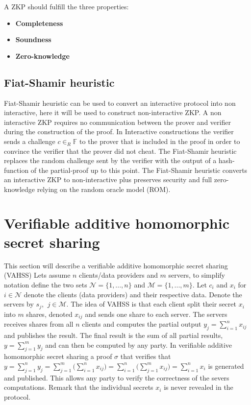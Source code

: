 \begin{Mydef}
\label{def:ZKP}
A ZKP should fulfill the three properties: 
\begin{itemize}
\item \textbf{Completeness} 
\item \textbf{Soundness} 
\item  \textbf{Zero-knowledge}
\end{itemize}
\end{Mydef}

\subsection*{Fiat-Shamir heuristic}
 Fiat-Shamir heuristic \cite{Fiat-Shamir} can be used to convert an interactive protocol into non interactive, here it will be used to construct non-interactive ZKP. A non interactive  ZKP requires no communication between the prover and verifier during the construction of the proof. In Interactive constructions the verifier sends a challenge $c\in_R\mathds{F}$ to the prover that is included in the proof in order to convince the verifier that the prover did not cheat. The Fiat-Shamir heuristic replaces the random challenge sent by the verifier with the output of a hash-function of the partial-proof up to this point. The Fiat-Shamir heuristic converts an interactive ZKP to non-interactive plus preserves security and full zero-knowledge relying on the random oracle model (ROM). 

\section{Verifiable additive homomorphic secret sharing}
\label{sec:VAHSS}

This section will describe a verifiable additive homomorphic secret sharing (VAHSS) Lets assume  $n$ clients/data providers and $m$ servers, to simplify notation define the two sets $\mathcal{N}=\{1,...,n\}$ and $\mathcal{M} = \{1,...,m\}$. Let $c_i$ and $x_i$ for $i\in\mathcal{N}$ denote the clients (data providers) and their respective data. Denote the servers by $s_j$, $\:j\in\mathcal{M}$. The idea of VAHSS is that each client split their secret $x_i$ into $m$ shares, denoted $x_{ij}$ and sends one share to each server. The servers receives shares from all $n$ clients and computes the partial output $y_j = \sum_{i=1}^n x_{ij} $ and publishes the result. The final result is the sum of all partial results, $y = \sum_{j=1}^m y_j$ and can then be computed by any party. In verifiable additive homomorphic secret sharing a proof $\sigma$ that verifies that $y= \sum_{j=1}^n y_j= \sum_{j=1}^m \big( \sum_{i=1}^n  x_{ij} \big) =  \sum_{i=1}^n \big( \sum_{j=1}^m  x_{ij} \big)  = \sum_{i=1}^n x_i$ is generated and published. This allows any party to verify the correctness of the severs computations. Remark that the individual secrets $x_i$ is never revealed in the protocol.


